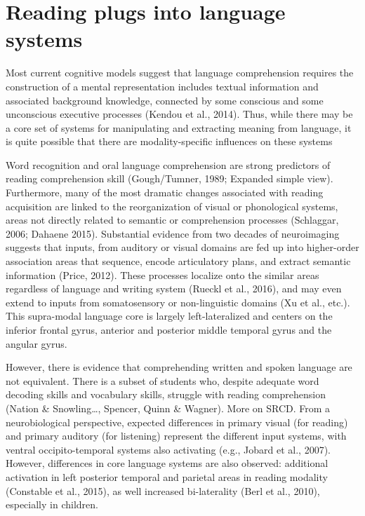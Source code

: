 \section{Reading plugs into language systems}
Most current cognitive models suggest that language comprehension requires the construction of a mental representation includes textual information and associated background knowledge, connected by some conscious and some unconscious executive processes (Kendou et al., 2014). Thus, while there may be a core set of systems for manipulating and extracting meaning from language, it is quite possible that there are modality-specific influences on these systems 

Word recognition and oral language comprehension are strong predictors of reading comprehension skill (Gough/Tumner, 1989; Expanded simple view). Furthermore, many of the most dramatic changes associated with reading acquisition are linked to the reorganization of visual or phonological systems, areas not directly related to semantic or comprehension processes (Schlaggar, 2006; Dahaene 2015). Substantial evidence from two decades of neuroimaging suggests that inputs, from auditory or visual domains are fed up into higher-order association areas that sequence, encode articulatory plans, and extract semantic information (Price, 2012). These processes localize onto the similar areas regardless of language and writing system (Rueckl et al., 2016), and may even extend to inputs from somatosensory or non-linguistic domains (Xu et al., etc.). This supra-modal language core is largely left-lateralized and centers on the inferior frontal gyrus, anterior and posterior middle temporal gyrus and the angular gyrus. 

However, there is evidence that comprehending written and spoken language are not equivalent. There is a subset of students who, despite adequate word decoding skills and vocabulary skills, struggle with reading comprehension (Nation \& Snowling…, Spencer, Quinn \& Wagner). More on SRCD. From a neurobiological perspective, expected differences in primary visual (for reading) and primary auditory (for listening) represent the different input systems, with ventral occipito-temporal systems also activating (e.g., Jobard et al., 2007). However, differences in core language systems are also observed: additional activation in left posterior temporal and parietal areas in reading modality (Constable et al., 2015), as well increased bi-laterality (Berl et al., 2010), especially in children. 

